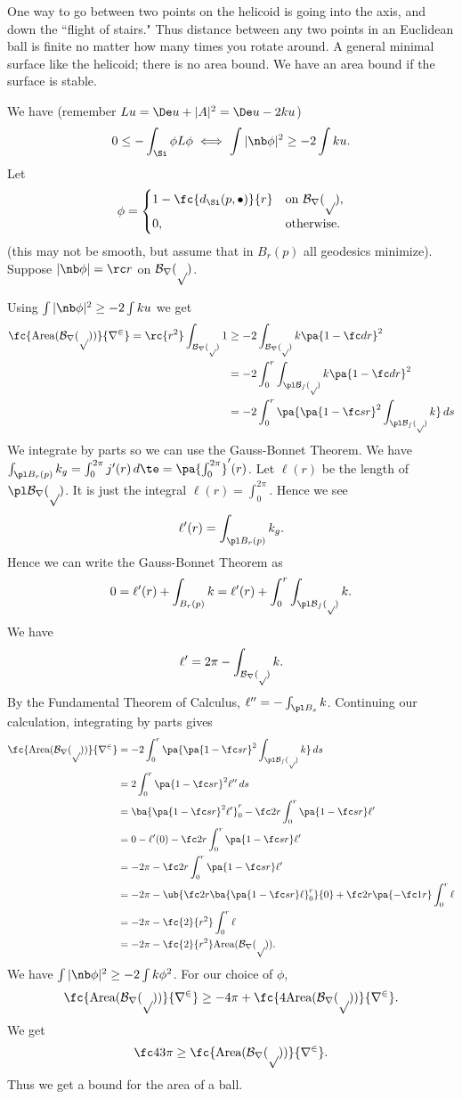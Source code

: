One way to go between two points on the helicoid is going into the axis, and down the ``flight of stairs." Thus distance between any two points in an Euclidean ball is finite no matter how many times you rotate around. A general minimal surface like the helicoid; there is no area bound. We have an area bound if the surface is stable.


We have (remember $Lu=\De u+|A|^2 =\De u-2ku$)
\[
0\le -\int_{\Si} \phi L\phi \iff \int |\nb \phi|^2\ge -2\int ku.
\]
Let 
\[\phi=\begin{cases}
1-\fc{d_{\Si}(p,\bullet)}{r}&\text{on }\cal B_r(p),\\
0,&\text{otherwise.}
\end{cases}
\]
(this may not be smooth, but assume that in $B_r(p)$ all geodesics minimize). %
Suppose $|\nb \phi|=\rc r$ on $\cal B_r(p)$. 

Using $\int |\nb \phi|^2\ge -2\int ku$ we get
\begin{align*}
\fc{\text{Area}(\cal B_r(p))}{r^2}=\rc{r^2}\int_{\cal B_r(p)} 1&\ge -2\int_{\cal B_r(p)} k\pa{1-\fc dr}^2\\
&=-2\int_0^r\int_{\pl \cal B_s(p)}k\pa{1-\fc dr}^2\\
&=-2\int_0^r\pa{
\pa{1-\fc sr}^2 \int_{\pl \cal B_s(p)} k
}\,ds
\end{align*}
We integrate by parts so we can use the Gauss-Bonnet Theorem.
We have $\int_{\pl B_r(p)}k_g=\int_0^{2\pi}j'(r)\,d\te=\pa{\int_0^{2\pi}}'(r)$. %
Let $\ell(r)$ be the length of $\pl \cal B_r(p)$. It is just the integral $\ell(r)=\int_0^{2\pi}$. Hence we see
\[
\ell'(r)=\int_{\pl B_r(p)}k_g.
\]
Hence we can write the Gauss-Bonnet Theorem as
\[
0=\ell'(r)+\int_{B_r(p)} k=\ell'(r)+\int_0^r \int_{\pl \cal B_s(p)} k.
\]
We have 
\[
\ell'=2\pi-\int_{\cal B_r(p)}k.
\]
By the Fundamental Theorem of Calculus, $\ell''=-\int_{\pl B_s} k$.
Continuing our calculation, integrating by parts gives
\begin{align*}
\fc{\text{Area}(\cal B_r(p))}{r^2}&=-2\int_0^r\pa{
\pa{1-\fc sr}^2 \int_{\pl \cal B_s(p)} k
}\,ds\\
&=2\int_0^r \pa{1-\fc sr}^2 \ell''\,ds\\
&=\ba{\pa{1-\fc sr}^2\ell'}^r_0 -\fc 2r\int_0^r \pa{1-\fc sr}\ell'\\
&=0-\ell'(0)-\fc 2r\int_0^r\pa{1-\fc sr}\ell'\\
&=-2\pi -\fc 2r\int_0^r \pa{1-\fc sr}\ell'\\
&=-2\pi -\ub{\fc 2r\ba{\pa{1-\fc sr}\ell}^r_0}{0} + \fc 2r \pa{-\fc 1r}\int_0^r\ell\\
&=-2\pi -\fc{2}{r^2}\int_0^r\ell\\
&=-2\pi -\fc{2}{r^2}\text{Area}(\cal B_r(p)).
\end{align*}
We have $\int |\nb\phi|^2\ge -2\int k\phi^2$. For our choice of $\phi$, 
\[
\fc{\text{Area}(\cal B_r(p))}{r^2}\ge -4\pi +\fc{4\text{Area}(\cal B_r(p))}{r^2}.
\]
We get
\[
\fc 43\pi \ge\fc{ \text{Area}(\cal B_r(p))}{r^2}.
\]
Thus we get a bound for the area of a ball.
